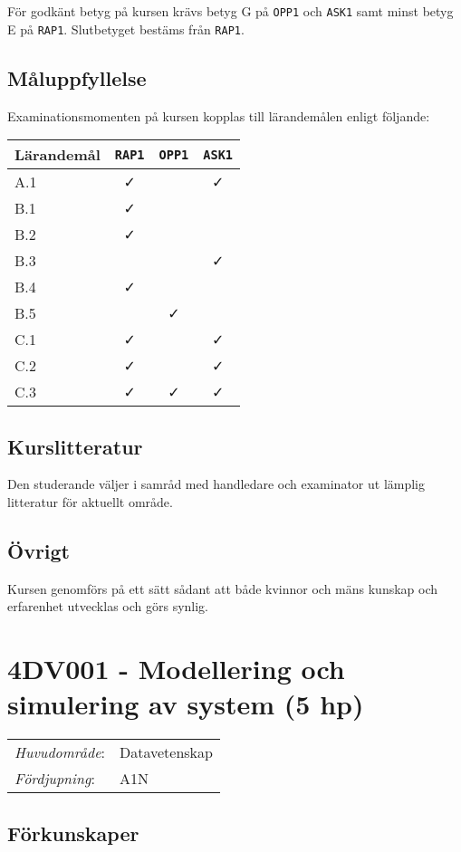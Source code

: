 För godkänt betyg på kursen krävs betyg G på \texttt{OPP1} och \texttt{ASK1} samt minst
betyg E på \texttt{RAP1}. Slutbetyget bestäms från \texttt{RAP1}.

\subsection*{Måluppfyllelse}

Examinationsmomenten på kursen kopplas till lärandemålen enligt
följande:

\begin{longtable}[]{@{}lccc@{}}
\toprule
\textsf{Lärandemål} & \texttt{RAP1} & \texttt{OPP1} & \texttt{ASK1}\tabularnewline
\midrule
\endhead
A.1 & \faCheck & & \faCheck\tabularnewline
B.1 & \faCheck & &\tabularnewline
B.2 & \faCheck & &\tabularnewline
B.3 & & & \faCheck\tabularnewline
B.4 & \faCheck & &\tabularnewline
B.5 & & \faCheck &\tabularnewline
C.1 & \faCheck & & \faCheck\tabularnewline
C.2 & \faCheck & & \faCheck\tabularnewline
C.3 & \faCheck & \faCheck & \faCheck\tabularnewline
\bottomrule
\end{longtable}

\subsection*{Kurslitteratur}

Den studerande väljer i samråd med handledare och examinator ut lämplig
litteratur för aktuellt område.

\subsection*{Övrigt}

Kursen genomförs på ett sätt sådant att både kvinnor och mäns kunskap och erfarenhet utvecklas och görs synlig.
\pagebreak
\section*{4DV001 - Modellering och simulering av system (5 hp)}

\begin{tabular}{ll}\emph{Huvudområde}: & Datavetenskap\tabularnewline\emph{Fördjupning}: & A1N\tabularnewline\end{tabular}

\subsection*{Förkunskaper}

